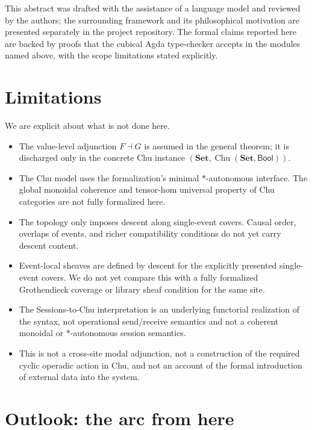 \documentclass[11pt]{article}
\newcommand{\Set}{\mathbf{Set}}
\newcommand{\Bool}{\mathsf{Bool}}
\newcommand{\Chu}{\operatorname{Chu}}
\begin{document}
This abstract was drafted with the assistance of a language model and reviewed
by the authors; the surrounding framework and its philosophical motivation are
presented separately in the project repository. The formal claims reported here
are backed by proofs that the cubical Agda type-checker accepts in the modules
named above, with the scope limitations stated explicitly.

\section*{Limitations}

We are explicit about what is not done here.
\begin{itemize}[leftmargin=1.4em,itemsep=2pt]
\item The value-level adjunction $F\dashv G$ is assumed in the general theorem;
it is discharged only in the concrete Chu instance
$(\Set,\Chu(\Set,\Bool))$.
\item The Chu model uses the formalization's minimal $*$-autonomous interface.
The global monoidal coherence and tensor-hom universal property of Chu
categories are not fully formalized here.
\item The topology only imposes descent along single-event covers. Causal order,
overlaps of events, and richer compatibility conditions do not yet carry descent
content.
\item Event-local sheaves are defined by descent for the explicitly presented
single-event covers. We do not yet compare this with a fully formalized
Grothendieck coverage or library sheaf condition for the same site.
\item The Sessions-to-Chu interpretation is an underlying functorial
realization of the syntax, not operational send/receive semantics and not a
coherent monoidal or $*$-autonomous session semantics.
\item This is not a cross-site modal adjunction, not a construction of the
required cyclic operadic action in Chu, and not an account of the formal
introduction of external data into the system.
\end{itemize}

\section*{Outlook: the arc from here}
\end{document}
